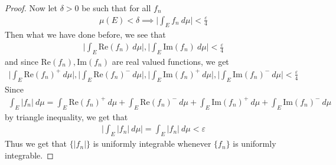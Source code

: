 \documentclass[12pt]{exam}
\theoremstyle{plain} %
\theoremstyle{definition} %
\theoremstyle{remark} %
\begin{document}
\begin{questions}
\begin{solution}
\begin{proof}
      Now let $\delta > 0$ be such that for all $f_n$
      \begin{align*}
        \mu(E) < \delta \implies \Bigg| \int_E f_n \ d \mu \Bigg| <
        \frac{\varepsilon}{4}
      \end{align*}
      Then what we have done before, we see that
      \begin{align*}
        \Bigg |\int_E \textrm{Re}(f_n) \ d \mu
        \Bigg| , \Bigg| \int_E
        \textrm{Im}(f_n) \ d \mu \Bigg| < \frac{\varepsilon}{4}
      \end{align*}
      and since $\textrm{Re}(f_n), \textrm{Im}(f_n)$ are real valued
      functions, we get
      \begin{align*}
        \Bigg| \int_E \textrm{Re}(f_n)^+ \ d \mu
        \Bigg|, \Bigg| \int_E \textrm{Re}(f_n)^- \ d \mu \Bigg|, \Bigg|
        \int_E \textrm{Im}(f_n)^+ \ d \mu \Bigg|, \Bigg| \int_E
        \textrm{Im}(f_n)^- \ d \mu \Bigg| < \frac{\varepsilon}{4}
      \end{align*}
      Since
      \begin{align*}
        \int_E |f_n| \ d \mu = \int_E \textrm{Re}(f_n)^+ \ d \mu + \int_E
        \textrm{Re}(f_n)^- \ d \mu + \int_E \textrm{Im}(f_n)^+ \ d \mu +
        \int_E \textrm{Im}(f_n)^- \ d \mu
      \end{align*}
      by triangle inequality, we get that
      \begin{align*}
        \Bigg|\int_E |f_n| \ d \mu \Bigg| = \int_E |f_n| \ d \mu  < \varepsilon
      \end{align*}
      Thus we get that $\{|f_n|\}$ is uniformly integrable whenever $\{
      f_n \}$ is uniformly integrable.
    \end{proof}


\end{solution}
\end{questions}
\end{document}
